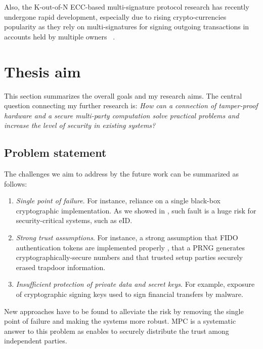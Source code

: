 \documentclass[
  digital, %
  twoside, %
  table,   %
  lof,     %
  lot,     %
]{fithesis3}
\newcounter{ph4_show_guides}
\theoremstyle{definition}
\theoremstyle{remark}
\begin{document}
\begin{ecmmnt} %
Also, the K-out-of-N ECC-based multi-signature protocol research has recently undergone rapid development, especially due to rising crypto-currencies popularity as they rely on multi-signatures for signing outgoing transactions in accounts held by multiple owners ~\cite{Bellare:2007:UAS:2394539.2394589, Bnz2017BulletproofsSP, cryptoeprint:2018:068}. 
\end{ecmmnt}



\chapter{Thesis aim}\label{sec:aim}
This section summarizes the overall goals and my research aims.
The central question connecting my further research is: \emph{How can a connection of tamper-proof hardware and a secure multi-party computation solve practical problems and increase the level of security in existing systems?}

\section{Problem statement}
The challenges we aim to address by the future work can be summarized as follows:

\begin{enumerate}
	\item \emph{Single point of failure}. For instance, reliance on a single black-box cryptographic implementation. As we showed in \cite{2017-ccs-nemec}, such fault is a huge risk for security-critical systems, such as eID.
	
	\item \emph{Strong trust assumptions}. For instance, a strong assumption that FIDO authentication tokens are implemented properly \cite{DCMBR18}, that a PRNG generates cryptographically-secure numbers and that trusted setup parties securely erased trapdoor information.
	
	\item \emph{Insufficient protection of private data and secret keys}. 
	For example, exposure of cryptographic signing keys used to sign financial transfers by malware.
\end{enumerate}
 
New approaches have to be found to alleviate the risk by removing the single point of failure and making the systems more robust. MPC is a systematic answer to this problem as enables to securely distribute the trust among independent parties.
\end{document}
